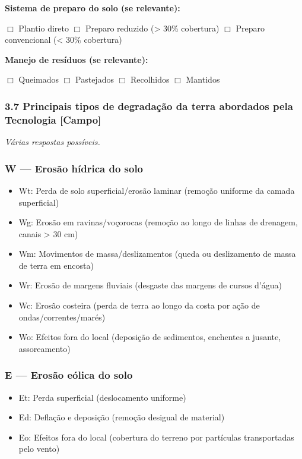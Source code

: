 \textbf{Sistema de preparo do solo (se relevante):}

$\Box$ Plantio direto $\Box$ Preparo reduzido (\textgreater{} 30\% cobertura) $\Box$ Preparo convencional (\textless{} 30\% cobertura)

\textbf{Manejo de resíduos (se relevante):}

$\Box$ Queimados $\Box$ Pastejados $\Box$ Recolhidos $\Box$ Mantidos

\subsubsection{3.7 Principais tipos de degradação da terra abordados pela Tecnologia {[Campo]}}\label{principais-tipos-de-degradauxe7uxe3o-da-terra-abordados-pela-tecnologia}

\emph{Várias respostas possíveis.}

\subsubsection{W --- Erosão hídrica do solo}\label{w-erosuxe3o-huxeddrica-do-solo}

\begin{itemize}
\tightlist
\item[$\square$]
  Wt: Perda de solo superficial/erosão laminar (remoção uniforme da camada superficial)
\item[$\square$]
  Wg: Erosão em ravinas/voçorocas (remoção ao longo de linhas de drenagem, canais \textgreater{} 30 cm)
\item[$\square$]
  Wm: Movimentos de massa/deslizamentos (queda ou deslizamento de massa de terra em encosta)
\item[$\square$]
  Wr: Erosão de margens fluviais (desgaste das margens de cursos d'água)
\item[$\square$]
  Wc: Erosão costeira (perda de terra ao longo da costa por ação de ondas/correntes/marés)
\item[$\square$]
  Wo: Efeitos fora do local (deposição de sedimentos, enchentes a jusante, assoreamento)
\end{itemize}

\subsubsection{E --- Erosão eólica do solo}\label{e-erosuxe3o-euxf3lica-do-solo}

\begin{itemize}
\tightlist
\item[$\square$]
  Et: Perda superficial (deslocamento uniforme)
\item[$\square$]
  Ed: Deflação e deposição (remoção desigual de material)
\item[$\square$]
  Eo: Efeitos fora do local (cobertura do terreno por partículas transportadas pelo vento)
\end{itemize}

